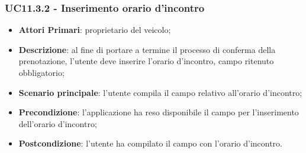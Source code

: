 \subsubsection{UC11.3.2 - Inserimento orario d'incontro}
\begin{itemize}
	\item \textbf{Attori Primari}: proprietario del veicolo;
	\item \textbf{Descrizione}: al fine di portare a termine il processo di conferma della prenotazione, l'utente deve inserire l'orario d'incontro, campo ritenuto obbligatorio;
	\item \textbf{Scenario principale}: l'utente compila il campo relativo all'orario d'incontro;	
	\item \textbf{Precondizione}: l'applicazione ha reso disponibile il campo per l'inserimento dell'orario d'incontro;
	\item \textbf{Postcondizione}: l'utente ha compilato il campo con l'orario d'incontro.	
\end{itemize}


